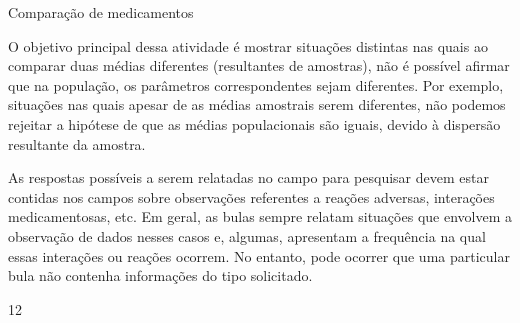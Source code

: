 \begin{sugestions}{Comparação de medicamentos}
{
O objetivo principal dessa atividade é mostrar situações distintas nas quais ao comparar duas médias diferentes (resultantes de amostras), não é possível afirmar que na população, os parâmetros correspondentes sejam diferentes. Por exemplo, situações nas quais apesar de as médias amostrais serem diferentes, não podemos rejeitar a hipótese de que as médias populacionais são iguais, devido à dispersão resultante da amostra.

As respostas possíveis a serem relatadas no campo para pesquisar devem estar contidas nos campos sobre observações referentes a reações adversas, interações medicamentosas, etc. Em geral, as bulas sempre relatam situações que envolvem a observação de dados nesses casos e, algumas, apresentam a frequência na qual essas interações ou reações ocorrem. No entanto, pode ocorrer que uma particular bula não contenha informações do tipo solicitado.
}{1}{2}
\end{sugestions}
